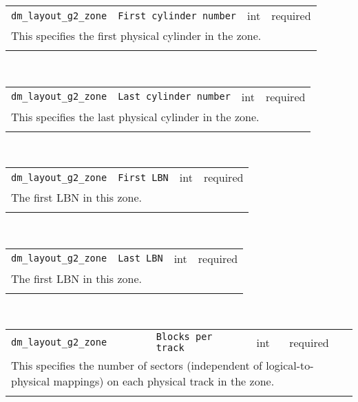 \noindent 
\begin{tabular}{|p{\lpmodwidth}|p{\lpnamewidth}|p{0.5in}|p{0.5in}|}
\cline{1-4}
\texttt{dm\_layout\_g2\_zone} & \texttt{First cylinder number} & int & required \\ 
\cline{1-4}
\multicolumn{4}{|p{6in}|}{
This specifies the first physical cylinder in the zone.
}\\ 
\cline{1-4}
\multicolumn{4}{p{5in}}{}\\
\end{tabular}\\ 
\noindent 
\begin{tabular}{|p{\lpmodwidth}|p{\lpnamewidth}|p{0.5in}|p{0.5in}|}
\cline{1-4}
\texttt{dm\_layout\_g2\_zone} & \texttt{Last cylinder number} & int & required \\ 
\cline{1-4}
\multicolumn{4}{|p{6in}|}{
This specifies the last physical cylinder in the zone.
}\\ 
\cline{1-4}
\multicolumn{4}{p{5in}}{}\\
\end{tabular}\\ 
\noindent 
\begin{tabular}{|p{\lpmodwidth}|p{\lpnamewidth}|p{0.5in}|p{0.5in}|}
\cline{1-4}
\texttt{dm\_layout\_g2\_zone} & \texttt{First LBN} & int & required \\ 
\cline{1-4}
\multicolumn{4}{|p{6in}|}{
The first LBN in this zone.
}\\ 
\cline{1-4}
\multicolumn{4}{p{5in}}{}\\
\end{tabular}\\ 
\noindent 
\begin{tabular}{|p{\lpmodwidth}|p{\lpnamewidth}|p{0.5in}|p{0.5in}|}
\cline{1-4}
\texttt{dm\_layout\_g2\_zone} & \texttt{Last LBN} & int & required \\ 
\cline{1-4}
\multicolumn{4}{|p{6in}|}{
The first LBN in this zone.
}\\ 
\cline{1-4}
\multicolumn{4}{p{5in}}{}\\
\end{tabular}\\ 
\noindent 
\begin{tabular}{|p{\lpmodwidth}|p{\lpnamewidth}|p{0.5in}|p{0.5in}|}
\cline{1-4}
\texttt{dm\_layout\_g2\_zone} & \texttt{Blocks per track} & int & required \\ 
\cline{1-4}
\multicolumn{4}{|p{6in}|}{
This specifies the number of sectors (independent of logical-to-physical
mappings) on each physical track in the zone.
}\\ 
\cline{1-4}
\multicolumn{4}{p{5in}}{}\\
\end{tabular}\\ 
